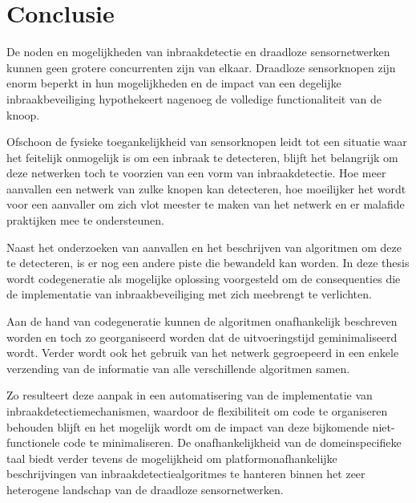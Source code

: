 \documentclass[12pt,a4paper]{article}
\begin{document}
\section*{Conclusie}

De noden en mogelijkheden van inbraakdetectie en draadloze sensornetwerken
kunnen geen grotere concurrenten zijn van elkaar. Draadloze sensorknopen zijn
enorm beperkt in hun mogelijkheden en de impact van een degelijke
inbraakbeveiliging hypothekeert nagenoeg de volledige functionaliteit van de
knoop.

Ofschoon de fysieke toegankelijkheid van sensorknopen leidt tot een situatie
waar het feitelijk onmogelijk is om een inbraak te detecteren, blijft het
belangrijk om deze netwerken toch te voorzien van een vorm van inbraakdetectie.
Hoe meer aanvallen een netwerk van zulke knopen kan detecteren, hoe moeilijker
het wordt voor een aanvaller om zich vlot meester te maken van het netwerk en
er malafide praktijken mee te ondersteunen.

Naast het onderzoeken van aanvallen en het beschrijven van algoritmen om deze
te detecteren, is er nog een andere piste die bewandeld kan worden. In deze
thesis wordt codegeneratie als mogelijke oplossing voorgesteld om de
consequenties die de implementatie van inbraakbeveiliging met zich meebrengt te
verlichten.

Aan de hand van codegeneratie kunnen de algoritmen onafhankelijk beschreven
worden en toch zo georganiseerd worden dat de uitvoeringstijd geminimaliseerd
wordt. Verder wordt ook het gebruik van het netwerk gegroepeerd in een enkele
verzending van de informatie van alle verschillende algoritmen samen.

Zo resulteert deze aanpak in een automatisering van de implementatie van
inbraakdetectiemechanismen, waardoor de flexibiliteit om code te organiseren
behouden blijft en het mogelijk wordt om de impact van deze bijkomende
niet-functionele code te minimaliseren. De onafhankelijkheid van de
domeinspecifieke taal biedt verder tevens de mogelijkheid om
platformonafhankelijke beschrijvingen van inbraakdetectiealgoritmes te
hanteren binnen het zeer heterogene landschap van de draadloze sensornetwerken.
\end{document}
